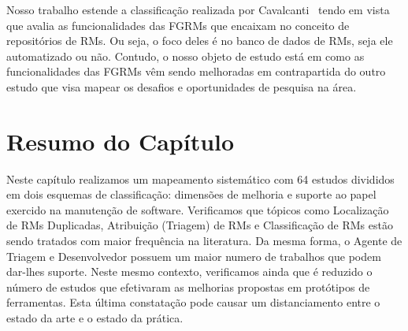 Nosso trabalho estende a classificação realizada por
Cavalcanti~\cite{cavalcanti2014challenges} tendo em vista que avalia as
funcionalidades das FGRMs que encaixam no conceito de repositórios de RMs. Ou
seja, o foco deles é no banco de dados de RMs, seja ele automatizado ou não.
Contudo, o nosso objeto de estudo está em como as funcionalidades das FGRMs vêm
sendo melhoradas em contrapartida do outro estudo que visa mapear os desafios e
oportunidades de pesquisa na área.

\section{Resumo do Capítulo}
\label{sec:resumo_capitulo}

Neste capítulo realizamos um mapeamento sistemático com 64 estudos divididos em
dois esquemas de classificação: dimensões de melhoria e suporte ao papel
exercido na manutenção de software. Verificamos que tópicos como Localização de
RMs Duplicadas, Atribuição (Triagem) de RMs e Classificação de RMs estão sendo
tratados com maior frequência na literatura. Da mesma forma, o Agente de Triagem
e Desenvolvedor possuem um maior numero de trabalhos que podem dar-lhes suporte.
Neste mesmo contexto, verificamos ainda que é reduzido o número de estudos que
efetivaram as melhorias propostas em protótipos de ferramentas. Esta última
constatação pode causar um distanciamento entre o estado da arte e o estado da
prática.